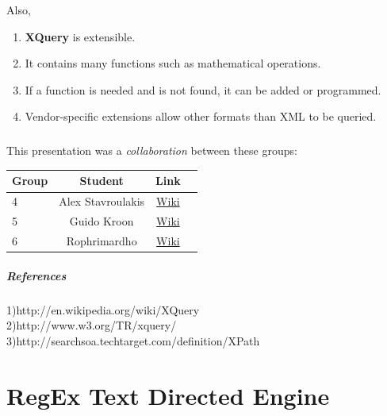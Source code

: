 \documentclass[a4paper,11pt]{report}
\begin{document}
 Also, \\
 
 \begin{enumerate}
  \item \textbf{XQuery} is extensible.
  \item It contains many functions such as mathematical operations.
  \item If a function is needed and is not found, it can be added or programmed.
  \item Vendor-specific extensions allow other formats than XML to be queried.
\end{enumerate}


\paragraph{}
This presentation was a \emph{collaboration} between these groups: \\
 
\begin{center}
 \begin{tabular}{| l | c | c | c |}
 \hline \textbf{Group} & \textbf{Student} & \textbf{Link} \\
 \hline 
 4 & Alex Stavroulakis & \href{https://www.os3.nl/2014-2015/students/alexandros_stavroulakis/es}{Wiki}\\
 \hline 
 5 & Guido Kroon & \href{https://www.os3.nl/2014-2015/students/guido_kroon/es/assignments1}{Wiki} \\ 
 \hline 
 6 & Rophrimardho & \href{https://www.os3.nl/2014-2015/students/rohprimardho/es/homework_1.3}{Wiki} \\ 
 \hline 
 \end{tabular} 
\end{center}
 
\paragraph{References\\}
1)http://en.wikipedia.org/wiki/XQuery \\
2)http://www.w3.org/TR/xquery/ \\
3)http://searchsoa.techtarget.com/definition/XPath \\


\chapter{RegEx Text Directed Engine}
\end{document}
